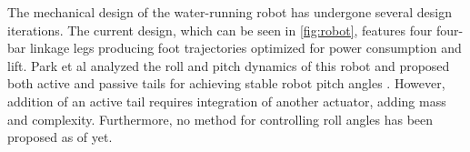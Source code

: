 The mechanical design of the water-running robot has undergone several design iterations. The current design, which can be seen in \ref{fig:robot}, features four four-bar linkage legs producing  foot trajectories optimized for power consumption and lift. Park et al analyzed the roll and pitch dynamics of this robot and proposed both active and passive tails for achieving stable robot pitch angles \cite{park2010roll}. However, addition of an active tail requires integration of another actuator, adding mass and complexity. Furthermore, no method for controlling roll angles has been proposed as of yet.

